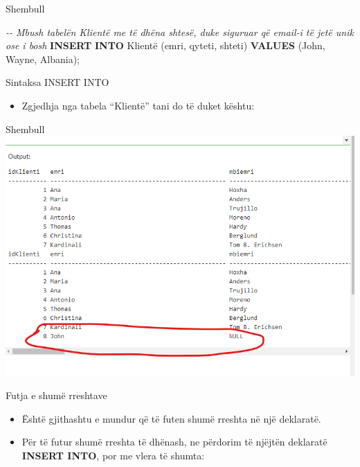\documentclass[
  ignorenonframetext,
]{beamer}
\newenvironment{Shaded}{\begin{snugshade}}{\end{snugshade}}
\newcommand{\CommentTok}[1]{\textcolor[rgb]{0.56,0.35,0.01}{\textit{#1}}}
\newcommand{\KeywordTok}[1]{\textcolor[rgb]{0.13,0.29,0.53}{\textbf{#1}}}
\newcommand{\NormalTok}[1]{#1}
\newcommand{\StringTok}[1]{\textcolor[rgb]{0.31,0.60,0.02}{#1}}
\providecommand{\tightlist}{%
  \setlength{\itemsep}{0pt}\setlength{\parskip}{0pt}}
\begin{document}
\begin{frame}[fragile]{Shembull}
\label{shembull-4}

\begin{Shaded}
\begin{Highlighting}[]
\CommentTok{{-}{-} Mbush tabelën Klientë me të dhëna shtesë, duke siguruar që email{-}i të jetë unik ose i bosh}
\KeywordTok{INSERT} \KeywordTok{INTO}\NormalTok{ Klientë (emri, qyteti, shteti)}
\KeywordTok{VALUES}\NormalTok{ (}\StringTok{\textquotesingle{}John\textquotesingle{}}\NormalTok{, }\StringTok{\textquotesingle{}Wayne\textquotesingle{}}\NormalTok{, }\StringTok{\textquotesingle{}Albania\textquotesingle{}}\NormalTok{);}
\end{Highlighting}
\end{Shaded}
\end{frame}

\begin{frame}{Sintaksa INSERT INTO}
\label{sintaksa-insert-into-4}
\begin{itemize}
\tightlist
\item
  Zgjedhja nga tabela ``Klientë'' tani do të duket kështu:
\end{itemize}
\end{frame}

\begin{frame}{Shembull}
\label{shembull-5}
\includegraphics{./Figs/query31.png}
\end{frame}

\begin{frame}{Futja e shumë rreshtave}
\label{futja-e-shumuxeb-rreshtave}
\begin{itemize}
\item
  Është gjithashtu e mundur që të futen shumë rreshta në një deklaratë.
\item
  Për të futur shumë rreshta të dhënash, ne përdorim të njëjtën
  deklaratë \textbf{INSERT INTO}, por me vlera të shumta:
\end{itemize}
\end{frame}
\end{document}
